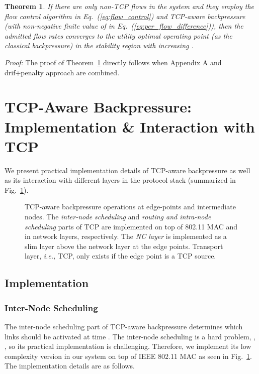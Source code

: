 \documentclass[conference]{IEEEtran}
\newcommand{\ie}{{\em i.e., }}
\newtheorem{theorem}{Theorem}
\begin{document}
\begin{theorem}\label{theorem2}
If there are only non-TCP flows in the system and they employ the flow control algorithm in Eq.~(\ref{eq:flow_control}) and TCP-aware backpressure (with non-negative finite value of  in Eq.~(\ref{eq:per_flow_difference})), then the admitted flow rates converges to the utility optimal operating point (as the classical backpressure) in the stability region  with increasing .
\end{theorem}
{\em Proof:} The proof of Theorem~\ref{theorem2} directly follows when Appendix A and drif+penalty approach \cite{neely_mod} are combined. \hfill 






\section{TCP-Aware Backpressure: Implementation \& Interaction with TCP}\label{sec:algs}
We present practical implementation details of TCP-aware backpressure as well as its interaction with different layers in the protocol stack (summarized in Fig.~\ref{fig:protocol_stack}).

\begin{figure}
\hspace{-5pt}
\centering
{}
\caption{\scriptsize  TCP-aware backpressure operations at edge-points and intermediate nodes. The {\em inter-node scheduling} and {\em routing and intra-node scheduling} parts of TCP are implemented on top of 802.11 MAC and in network layers, respectively. The {\em NC layer} is implemented as a slim layer above the network layer at the edge points. Transport layer, \ie TCP, only exists if the edge point is a TCP source.
}
\vspace{-10pt}
\label{fig:protocol_stack}
\vspace{-20pt}
\end{figure}


\subsection{Implementation}
\subsubsection{Inter-Node Scheduling}
The inter-node scheduling part of TCP-aware backpressure determines which links should be activated at time .  The inter-node scheduling is a hard problem, \cite{tutorial_doyle}, \cite{lin_schroff_tutorial}, so its practical implementation is challenging. Therefore, we implement its low complexity version in our system on top of IEEE 802.11 MAC as seen in Fig.~\ref{fig:protocol_stack}. The implementation details are as follows.
\end{document}
